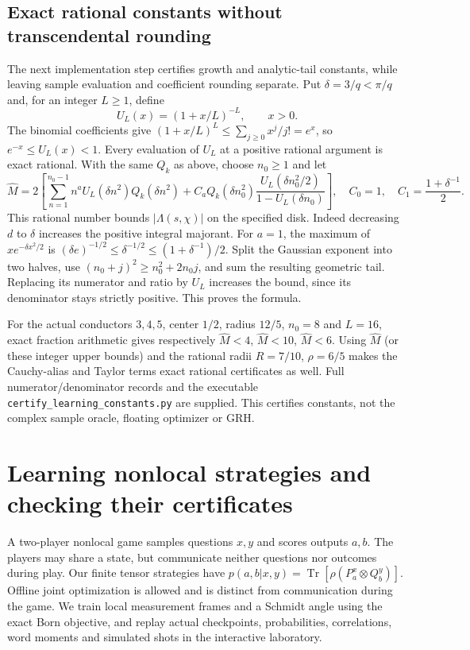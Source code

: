 \documentclass[11pt,oneside,openany]{book}
\theoremstyle{definition}\newtheorem{definition}[theorem]{Definition}
\theoremstyle{remark}\newtheorem{remark}[theorem]{Remark}
\begin{document}
\subsection{Exact rational constants without transcendental rounding}
The next implementation step certifies growth and analytic-tail constants,
while leaving sample evaluation and coefficient rounding separate. Put
$\delta=3/q<\pi/q$ and, for an integer $L\ge1$, define
\[
 U_L(x)=(1+x/L)^{-L},\qquad x>0.
\]
The binomial coefficients give
$(1+x/L)^L\le\sum_{j\ge0}x^j/j!=e^x$, so $e^{-x}\le U_L(x)<1$.
Every evaluation of $U_L$ at a positive rational argument is exact rational.
With the same $Q_k$ as above, choose $n_0\ge1$ and let
\[
 \widehat M=2\left[
 \sum_{n=1}^{n_0-1} n^aU_L(\delta n^2)Q_k(\delta n^2)
 +C_aQ_k(\delta n_0^2)
 \frac{U_L(\delta n_0^2/2)}{1-U_L(\delta n_0)}\right],
 \quad C_0=1,\quad C_1=\frac{1+\delta^{-1}}2.
\]
This rational number bounds $|\Lambda(s,\chi)|$ on the specified disk.
Indeed decreasing $d$ to $\delta$ increases the positive integral majorant.
For $a=1$, the maximum of $x e^{-\delta x^2/2}$ is
$(\delta e)^{-1/2}\le\delta^{-1/2}\le(1+\delta^{-1})/2$.
Split the Gaussian exponent into two halves, use
$(n_0+j)^2\ge n_0^2+2n_0j$, and sum the resulting geometric tail.
Replacing its numerator and ratio by $U_L$ increases the bound, since its
denominator stays strictly positive. This proves the formula.

For the actual conductors $3,4,5$, center $1/2$, radius $12/5$, $n_0=8$
and $L=16$, exact fraction arithmetic gives respectively
$\widehat M<4$, $\widehat M<10$, $\widehat M<6$.
Using $\widehat M$ (or these integer upper bounds) and the rational radii
$R=7/10$, $\rho=6/5$ makes the Cauchy-alias and Taylor terms exact rational
certificates as well. Full numerator/denominator records and the executable
\texttt{certify\_learning\_constants.py} are supplied. This certifies
constants, not the complex sample oracle, floating optimizer or GRH.

\section{Learning nonlocal strategies and checking their certificates}
\label{qg:section}
A two-player nonlocal game samples questions $x,y$ and scores outputs $a,b$.
The players may share a state, but communicate neither questions nor outcomes
during play. Our finite tensor strategies have
$p(a,b|x,y)=\operatorname{Tr}[\rho(P_a^x\otimes Q_b^y)]$.
Offline joint optimization is allowed and is distinct from communication
during the game. We train local measurement frames and a Schmidt angle using
the exact Born objective, and replay actual checkpoints, probabilities,
correlations, word moments and simulated shots in the interactive laboratory.
\end{document}
